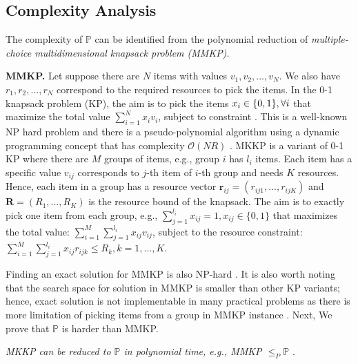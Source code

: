 \subsection{Complexity Analysis}

The complexity of $\mathbb{P}$ can be identified from the polynomial reduction of \textit{multiple-choice multidimensional knapsack problem (MMKP).} 

\textbf{MMKP.} Let suppose there are $N$ items with values ${v_1, v_2, ..., v_N}$. We also have $r_1, r_2, ..., r_N$ correspond to the required resources to pick the items. In the 0-1 knapsack problem (KP), the aim is to pick the items $x_i \in \{0, 1\}, {\color{black}\forall i}$ that maximize the total value $\sum_{i=1}^N  x_i v_i$, subject to constraint . This is a well-known NP hard problem and there is a pseudo-polynomial algorithm using a dynamic programming concept that has complexity $\mathcal{O}(NR)$ \cite{mmkp_convexhull}.  MKKP is a variant of 0-1 KP where there are $M$ groups of items, e.g., group $i$ has $l_i$ items. Each item has a specific value $v_{ij}$ corresponds to $j$-th item of $i$-th group and needs $K$ resources. Hence, each item in a group has a resource vector $\bm{r}_{ij} = (r_{ij1}, ..., r_{ijK} )$ and $\bm{R} = (R_1, ..., R_K)$ is the resource bound of the knapsack. The aim is to exactly pick one item from each group, e.g., $ \sum_{j=1}^{l_i} x_{ij} = 1, x_{ij} \in \{0,1\}$ that maximizes the total value: $\sum_{i=1}^{M} \sum_{j=1}^{l_i} x_{ij} v_{ij}$, subject to the resource constraint: $\sum_{i=1}^{M} \sum_{j=1}^{l_i} x_{ij} r_{ijk} \leq R_k, k = 1,...,K$. 

Finding an exact solution for MMKP is also NP-hard \cite{mmkp_convexhull}. It is also worth noting that the search space for solution in MMKP is smaller than other KP variants; hence, exact solution is not implementable in many practical problems as there is more limitation of picking items from a group in MMKP instance \cite{mmkp_convexhull}. Next, We prove that $\mathbb{P}$ is harder than MMKP. 

\noindent
\begin{theorem} \label{theo:mmkp}
	\textit{MKKP can be reduced to $\mathbb{P}$ in polynomial time, e.g., MMKP $\leq_P \mathbb{P}$ }.
\end{theorem}  

